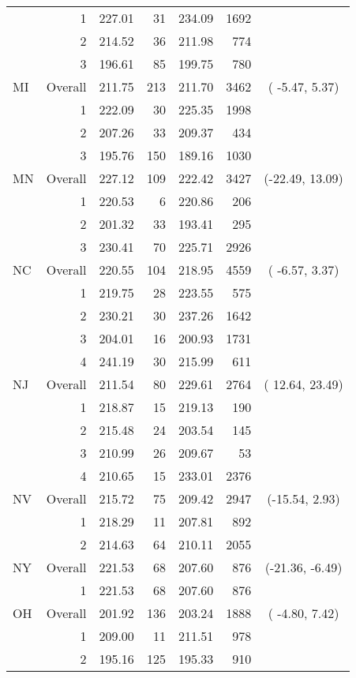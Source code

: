 \begin{longtable}{lrrr@{\extracolsep{.25cm}}rrc}
   & 1 & 227.01 &  31 & 234.09 & 1692 &  \\ 
   & 2 & 214.52 &  36 & 211.98 & 774 &  \\ 
   & 3 & 196.61 &  85 & 199.75 & 780 &  \\ 
   \hline
MI & Overall & 211.75 & 213 & 211.70 & 3462 & ( -5.47,  5.37) \\ 
   & 1 & 222.09 &  30 & 225.35 & 1998 &  \\ 
   & 2 & 207.26 &  33 & 209.37 & 434 &  \\ 
   & 3 & 195.76 & 150 & 189.16 & 1030 &  \\ 
   \hline
MN & Overall & 227.12 & 109 & 222.42 & 3427 & (-22.49, 13.09) \\ 
   & 1 & 220.53 &   6 & 220.86 & 206 &  \\ 
   & 2 & 201.32 &  33 & 193.41 & 295 &  \\ 
   & 3 & 230.41 &  70 & 225.71 & 2926 &  \\ 
   \hline
NC & Overall & 220.55 & 104 & 218.95 & 4559 & ( -6.57,  3.37) \\ 
   & 1 & 219.75 &  28 & 223.55 & 575 &  \\ 
   & 2 & 230.21 &  30 & 237.26 & 1642 &  \\ 
   & 3 & 204.01 &  16 & 200.93 & 1731 &  \\ 
   & 4 & 241.19 &  30 & 215.99 & 611 &  \\ 
   \hline
NJ & Overall & 211.54 &  80 & 229.61 & 2764 & ( 12.64, 23.49) \\ 
   & 1 & 218.87 &  15 & 219.13 & 190 &  \\ 
   & 2 & 215.48 &  24 & 203.54 & 145 &  \\ 
   & 3 & 210.99 &  26 & 209.67 &  53 &  \\ 
   & 4 & 210.65 &  15 & 233.01 & 2376 &  \\ 
   \hline
NV & Overall & 215.72 &  75 & 209.42 & 2947 & (-15.54,  2.93) \\ 
   & 1 & 218.29 &  11 & 207.81 & 892 &  \\ 
   & 2 & 214.63 &  64 & 210.11 & 2055 &  \\ 
   \hline
NY & Overall & 221.53 &  68 & 207.60 & 876 & (-21.36, -6.49) \\ 
   & 1 & 221.53 &  68 & 207.60 & 876 &  \\ 
   \hline
OH & Overall & 201.92 & 136 & 203.24 & 1888 & ( -4.80,  7.42) \\ 
   & 1 & 209.00 &  11 & 211.51 & 978 &  \\ 
   & 2 & 195.16 & 125 & 195.33 & 910 &  \\ 

\end{longtable}
